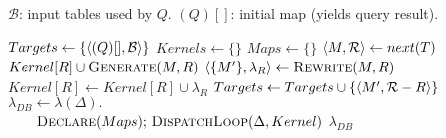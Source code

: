 \def\RETURN{\STATE}


\begin{algorithm}
\caption{$\compile(Q)$}
\label{alg:compile}
\begin{codebox}
\zi {}
\zi {}
\zi {}
\zi \>$\mathcal{B}$: input tables used by $Q$.
\zi \>$(Q)[]$: initial map (yields query result).
\end{codebox}
\begin{algorithmic}[1]
\STATE $Targets \leftarrow \{{\langle(Q)[],\mathcal{B}\rangle}\}$
\STATE $Kernels \leftarrow \{\}$
\STATE $Maps \leftarrow \{\}$
	\STATE ${\langle M,\mathcal{R}\rangle} \leftarrow next(T)$
		\STATE $Kernel[R] \cup \mbox{\sc Generate}(M,R)$
	\ELSE
			\STATE ${\langle\{M'\}, \lambda_R\rangle} \leftarrow \mbox{\sc Rewrite}(M,R)$
			\STATE $Kernel[R] \leftarrow Kernel[R] \cup \lambda_R$
			\STATE $Targets \leftarrow Targets \cup \{{\langle M',\mathcal{R}-R\rangle}\}$
		\ENDFOR
	\ENDIF
\ENDWHILE
\STATE $\lambda_{DB} \leftarrow \lambda(\Delta).$\\
$\qquad \mbox{\sc Declare}(Maps)\mbox{; \sc
DispatchLoop}(\Delta, Kernel)$
\RETURN $\lambda_{DB}$
\end{algorithmic}
\end{algorithm}

